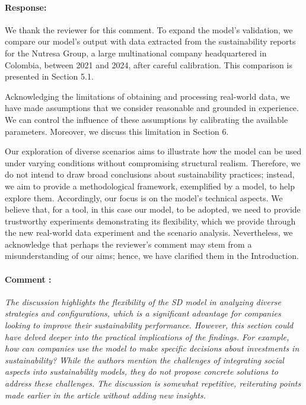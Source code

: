 \documentclass[11pt]{article}
\newcommand{\ReviewerComment}[1]{\paragraph*{Comment \stepcounter{NumComment}\arabic{NumComment}:} \textit{#1}}
\newcommand{\AuthorResponse}{\paragraph*{Response:}}
\begin{document}
    \AuthorResponse{We thank the reviewer for this comment. To expand the model's validation, we compare our model's output with data extracted from the sustainability reports for the Nutresa Group, a large multinational company headquartered in Colombia, between 2021 and 2024, after careful calibration. This comparison is presented in Section 5.1.

    Acknowledging the limitations of obtaining and processing real-world data, we have made assumptions that we consider reasonable and grounded in experience. We can control the influence of these assumptions by calibrating the available parameters. Moreover, we discuss this limitation in Section 6.
    
    Our exploration of diverse scenarios aims to illustrate how the model can be used under varying conditions without compromising structural realism. Therefore, we do not intend to draw broad conclusions about sustainability practices; instead, we aim to provide a methodological framework, exemplified by a model, to help explore them. Accordingly, our focus is on the model's technical aspects. We believe that, for a tool, in this case our model, to be adopted, we need to provide trustworthy experiments demonstrating its flexibility, which we provide through the new real-world data experiment and the scenario analysis. Nevertheless, we acknowledge that perhaps the reviewer's comment may stem from a misunderstanding of our aims; hence, we have clarified them in the Introduction.}
    
    \ReviewerComment{The discussion highlights the flexibility of the SD model in analyzing diverse strategies and configurations, which is a significant advantage for companies looking to improve their sustainability performance. However, this section could have delved deeper into the practical implications of the findings. For example, how can companies use the model to make specific decisions about investments in sustainability? While the authors mention the challenges of integrating social aspects into sustainability models, they do not propose concrete solutions to address these challenges. The discussion is somewhat repetitive, reiterating points made earlier in the article without adding new insights.}
\end{document}
